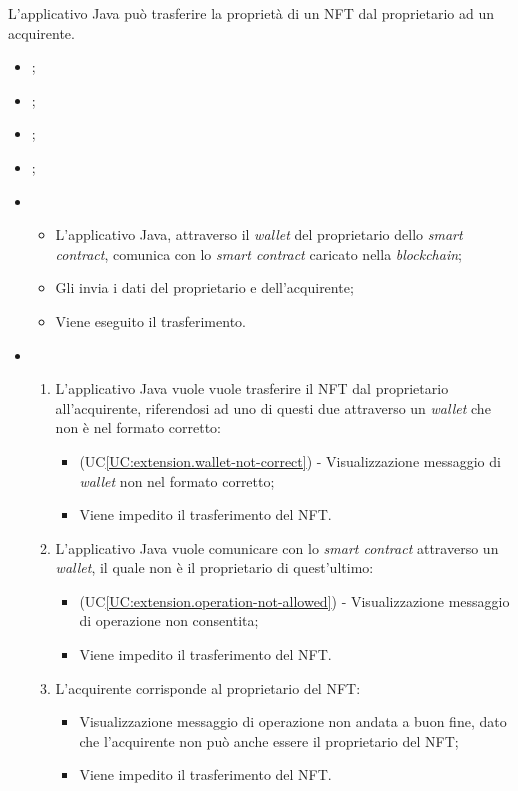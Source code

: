 L'applicativo Java può trasferire la proprietà di un NFT dal proprietario ad un acquirente.

\begin{itemize}
  \item {};
  \item {};
  \item {};
  \item {};
  
  \item \UCMain
  \begin{itemize}
    \item L'applicativo Java, attraverso il \textit{wallet} del proprietario dello \textit{smart contract}, comunica con lo \textit{smart contract} caricato nella \textit{blockchain};
    \item Gli invia i dati del proprietario e dell'acquirente;
    \item Viene eseguito il trasferimento.
  \end{itemize}

  \item \UCExt
  \begin{enumerate}[label=\lett]
    \item L'applicativo Java vuole vuole trasferire il NFT dal proprietario all'acquirente, riferendosi ad uno di questi due attraverso un \textit{wallet} che non è nel formato corretto:
    \begin{itemize}
      \item (UC\ref{UC:extension.wallet-not-correct}) - Visualizzazione messaggio di \textit{wallet} non nel formato corretto;
      \item Viene impedito il trasferimento del NFT.
    \end{itemize}

    \item L'applicativo Java vuole comunicare con lo \textit{smart contract} attraverso un \textit{wallet}, il quale non è il proprietario di quest'ultimo:
    \begin{itemize}
      \item (UC\ref{UC:extension.operation-not-allowed}) - Visualizzazione messaggio di operazione non consentita;
      \item Viene impedito il trasferimento del NFT.
    \end{itemize}

    \item L'acquirente corrisponde al proprietario del NFT:
    \begin{itemize}
      \item Visualizzazione messaggio di operazione non andata a buon fine, dato che l'acquirente non può anche essere il proprietario del NFT;
      \item Viene impedito il trasferimento del NFT.
    \end{itemize}
  \end{enumerate}
\end{itemize}

